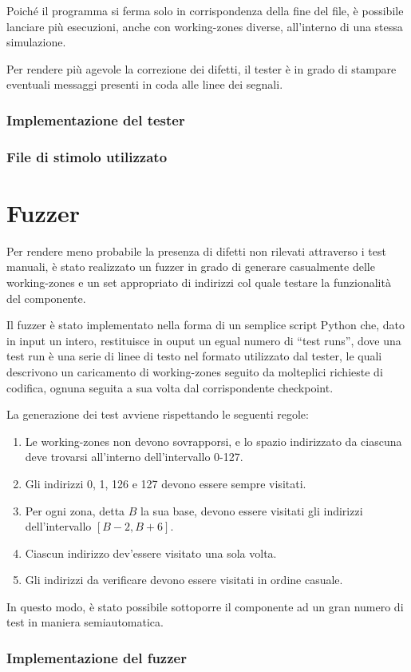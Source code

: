 \documentclass[11pt,a4paper]{article}
\begin{document}
Poiché il programma si ferma solo in corrispondenza della fine del file, è possibile lanciare più esecuzioni, anche con working-zones diverse, all'interno
di una stessa simulazione.

Per rendere più agevole la correzione dei difetti, il tester è in grado di stampare eventuali messaggi presenti in coda alle linee dei segnali.

\pagebreak
\subsubsection{Implementazione del tester}


\subsubsection{File di stimolo utilizzato}

\pagebreak

\section{Fuzzer}
\label{appendix:fuzzer}
Per rendere meno probabile la presenza di difetti non rilevati attraverso i test manuali, è stato realizzato un fuzzer in grado di generare casualmente
delle working-zones e un set appropriato di indirizzi col quale testare la funzionalità del componente.

Il fuzzer è stato implementato nella forma di un semplice script Python che, dato in input un intero, restituisce in ouput un egual numero di
``test runs'', dove una test run è una serie di linee di testo nel formato utilizzato dal tester, le quali descrivono un caricamento di working-zones
seguito da molteplici richieste di codifica, ognuna seguita a sua volta dal corrispondente checkpoint.

La generazione dei test avviene rispettando le seguenti regole:
\begin{enumerate}
    \item Le working-zones non devono sovrapporsi, e lo spazio indirizzato da ciascuna deve trovarsi all'interno dell'intervallo 0-127.
    \item Gli indirizzi 0, 1, 126 e 127 devono essere sempre visitati.
    \item Per ogni zona, detta $B$ la sua base, devono essere visitati gli indirizzi dell'intervallo $[B - 2, B + 6]$.
    \item Ciascun indirizzo dev'essere visitato una sola volta.
    \item Gli indirizzi da verificare devono essere visitati in ordine casuale.
\end{enumerate}

In questo modo, è stato possibile sottoporre il componente ad un gran numero di test in maniera semiautomatica.

\pagebreak
\subsubsection{Implementazione del fuzzer}

\end{document}
